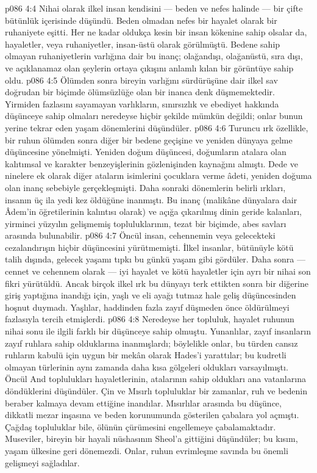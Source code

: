 \vs p086 4:4 Nihai olarak ilkel insan kendisini --- beden ve nefes halinde --- bir çifte bütünlük içerisinde düşündü. Beden olmadan nefes bir hayalet olarak bir ruhaniyete eşitti. Her ne kadar oldukça kesin bir insan kökenine sahip olsalar da, hayaletler, veya ruhaniyetler, insan\hyp{}üstü olarak görülmüştü. Bedene sahip olmayan ruhaniyetlerin varlığına dair bu inanç; olağandışı, olağanüstü, sıra dışı, ve açıklanamaz olan şeylerin ortaya çıkışını anlamlı kılan bir görüntüye sahip oldu.
\vs p086 4:5 Ölümden sonra bireyin varlığını sürdürüşüne dair ilkel sav doğrudan bir biçimde ölümsüzlüğe olan bir inanca denk düşmemektedir. Yirmiden fazlasını sayamayan varlıkların, sınırsızlık ve ebediyet hakkında düşünceye sahip olmaları neredeyse hiçbir şekilde mümkün değildi; onlar bunun yerine tekrar eden yaşam dönemlerini düşündüler.
\vs p086 4:6 Turuncu ırk özellikle, bir ruhun ölümden sonra diğer bir bedene geçişine ve yeniden dünyaya gelme düşüncesine yönelmişti. Yeniden doğum düşüncesi, doğumların atalara olan kalıtımsal ve karakter benzeyişlerinin gözlenişinden kaynağını almıştı. Dede ve ninelere ek olarak diğer ataların isimlerini çocuklara verme âdeti, yeniden doğuma olan inanç sebebiyle gerçekleşmişti. Daha sonraki dönemlerin belirli ırkları, insanın üç ila yedi kez öldüğüne inanmıştı. Bu inanç (malikâne dünyalara dair Âdem’in öğretilerinin kalıntısı olarak) ve açığa çıkarılmış dinin geride kalanları, yirminci yüzyılın gelişmemiş topluluklarının, tezat bir biçimde, abes savları arasında bulunabilir.
\vs p086 4:7 Öncül insan, cehennemin veya gelecekteki cezalandırışın hiçbir düşüncesini yürütmemişti. İlkel insanlar, bütünüyle kötü talih dışında, gelecek yaşamı tıpkı bu günkü yaşam gibi gördüler. Daha sonra --- cennet ve cehennem olarak --- iyi hayalet ve kötü hayaletler için ayrı bir nihai son fikri yürütüldü. Ancak birçok ilkel ırk bu dünyayı terk ettikten sonra bir diğerine giriş yaptığına inandığı için, yaşlı ve eli ayağı tutmaz hale geliş düşüncesinden hoşnut duymadı. Yaşlılar, haddinden fazla zayıf düşmeden önce öldürülmeyi fazlasıyla tercih etmişlerdi.
\vs p086 4:8 Neredeyse her topluluk, hayalet ruhunun nihai sonu ile ilgili farklı bir düşünceye sahip olmuştu. Yunanlılar, zayıf insanların zayıf ruhlara sahip olduklarına inanmışlardı; böylelikle onlar, bu türden cansız ruhların kabulü için uygun bir mekân olarak Hades’i yarattılar; bu kudretli olmayan türlerinin aynı zamanda daha kısa gölgeleri oldukları varsayılmıştı. Öncül And toplulukları hayaletlerinin, atalarının sahip oldukları ana vatanlarına döndüklerini düşündüler. Çin ve Mısırlı topluluklar bir zamanlar, ruh ve bedenin beraber kalmaya devam ettiğine inandılar. Mısırlılar arasında bu düşünce, dikkatli mezar inşasına ve beden korunumunda gösterilen çabalara yol açmıştı. Çağdaş topluluklar bile, ölünün çürümesini engellemeye çabalamaktadır. Museviler, bireyin bir hayali nüshasının Sheol’a gittiğini düşündüler; bu kısım, yaşam ülkesine geri dönemezdi. Onlar, ruhun evrimleşme savında bu önemli gelişmeyi sağladılar.
